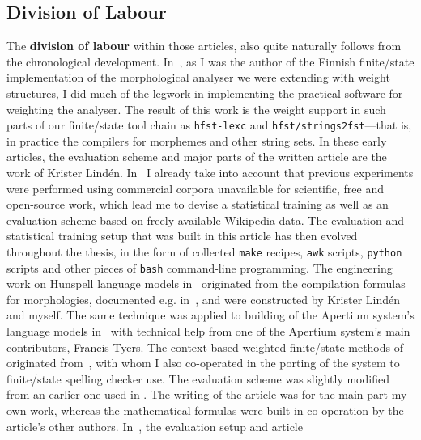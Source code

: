\documentclass[officiallayout,final]{unihelcompling}
\begin{document}
\subsection{Division of Labour}
\label{subsec:division-of-labour}

The \textbf{division of labour} within those articles, also quite naturally
follows from the chronological development.
In~, as I was the author
of the Finnish finite\-/state implementation of the morphological analyser we
were extending with weight structures, I did much of the legwork in
implementing the practical software for weighting the analyser. The result of
this work is the weight support in such parts of our finite\-/state tool chain
as \texttt{hfst-lexc} and \texttt{hfst\-/strings2fst}---that is, in practice
the compilers for morphemes and other string sets. In these early articles, the
evaluation scheme and major parts of the written article are the work of
Krister Lindén.  In~ I already take into
account that previous experiments were performed using commercial corpora
unavailable for scientific, free and open-source work, which lead me to devise
a statistical training as well as an evaluation scheme based on
freely-available Wikipedia data. The evaluation and statistical training setup
that was built in this article has then evolved throughout the thesis, in the
form of collected \texttt{make} recipes, \texttt{awk} scripts, \texttt{python}
scripts and other pieces of \texttt{bash} command-line programming. The
engineering work on Hunspell language models
in~ originated from the
compilation formulas for morphologies, documented e.g.\/
in~\cite{linden2009hfst}, and were constructed by Krister Lindén and myself.
The same technique was applied to building of the Apertium system's language
models in~ with technical help from one of the
Apertium system's main contributors, Francis Tyers.  The context-based weighted
finite\-/state methods of  originated
from~\citet{silfverberg2010partofspeech}, with whom I also co-operated in the
porting of the system to finite\-/state spelling checker use. The evaluation
scheme was slightly modified from an earlier one used in
. The writing of the article
 was for the main part  my own work, whereas
the mathematical formulas were built in co-operation by the article's other
authors.  In~, the evaluation setup and article
\end{document}
